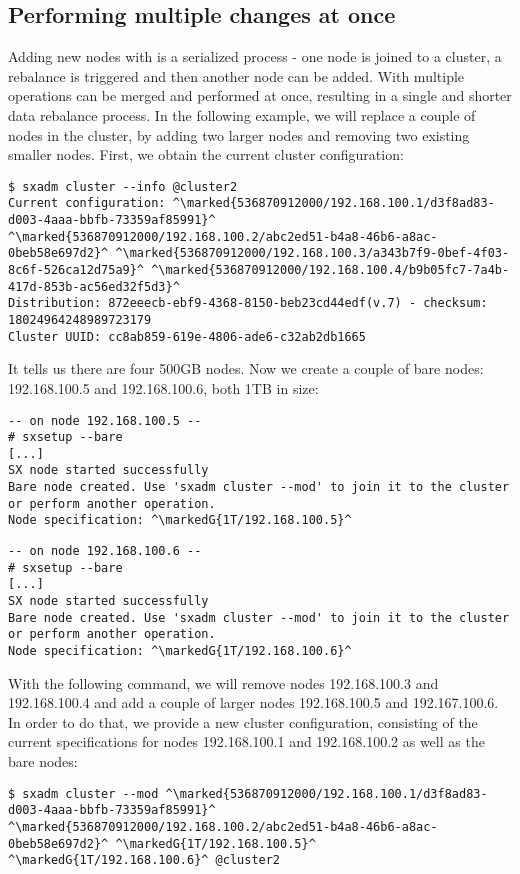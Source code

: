 \subsection{Performing multiple changes at once}
Adding new nodes with  is a serialized process - one node is
joined to a cluster, a rebalance is triggered and then another node can be
added. With  multiple operations can be merged
and performed at once, resulting in a single and shorter data rebalance
process. In the following example, we will replace a couple of nodes in the
cluster, by adding two larger nodes and removing two existing smaller nodes.
First, we obtain the current cluster configuration:
\begin{lstlisting}
$ sxadm cluster --info @cluster2
Current configuration: ^\marked{536870912000/192.168.100.1/d3f8ad83-d003-4aaa-bbfb-73359af85991}^ ^\marked{536870912000/192.168.100.2/abc2ed51-b4a8-46b6-a8ac-0beb58e697d2}^ ^\marked{536870912000/192.168.100.3/a343b7f9-0bef-4f03-8c6f-526ca12d75a9}^ ^\marked{536870912000/192.168.100.4/b9b05fc7-7a4b-417d-853b-ac56ed32f5d3}^
Distribution: 872eeecb-ebf9-4368-8150-beb23cd44edf(v.7) - checksum: 18024964248989723179
Cluster UUID: cc8ab859-619e-4806-ade6-c32ab2db1665
\end{lstlisting}
It tells us there are four 500GB nodes. Now we create a couple of bare nodes: 192.168.100.5
and 192.168.100.6, both 1TB in size:
\begin{lstlisting}
-- on node 192.168.100.5 --
# sxsetup --bare
[...]
SX node started successfully
Bare node created. Use 'sxadm cluster --mod' to join it to the cluster
or perform another operation.
Node specification: ^\markedG{1T/192.168.100.5}^
\end{lstlisting}
\begin{lstlisting}
-- on node 192.168.100.6 --
# sxsetup --bare
[...]
SX node started successfully
Bare node created. Use 'sxadm cluster --mod' to join it to the cluster
or perform another operation.
Node specification: ^\markedG{1T/192.168.100.6}^
\end{lstlisting}
With the following command, we will remove nodes 192.168.100.3 and
192.168.100.4 and add a couple of larger nodes 192.168.100.5 and
192.167.100.6. In order to do that, we provide a new cluster configuration,
consisting of the current specifications for nodes 192.168.100.1 and
192.168.100.2 as well as the bare nodes:
\begin{lstlisting}
$ sxadm cluster --mod ^\marked{536870912000/192.168.100.1/d3f8ad83-d003-4aaa-bbfb-73359af85991}^ ^\marked{536870912000/192.168.100.2/abc2ed51-b4a8-46b6-a8ac-0beb58e697d2}^ ^\markedG{1T/192.168.100.5}^ ^\markedG{1T/192.168.100.6}^ @cluster2
\end{lstlisting}
